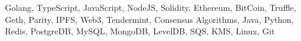 \vspace{-0.5em}
\vspace{-1.5em}
\begin{cventries}
  \cventry
    {}
    {}
    {}{}
    {
      \begin{cvitems}
        \item {Golang, TypeScript, JavaScript, NodeJS, Solidity, Ethereum, BitCoin, Truffle, Geth, Parity, IPFS, Web3, Tendermint, Consensus Algorithms, Java, Python, Redis, PostgreDB, MySQL, MongoDB, LevelDB, SQS, KMS, Linux, Git}         
      \end{cvitems}
    }
    
\end{cventries}
